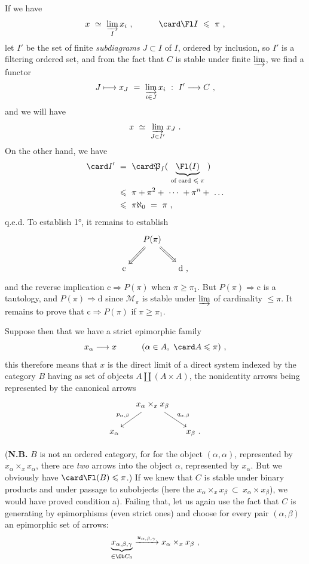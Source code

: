 
If we have
\[ x \ \simeq \ \varinjlim_{I} x_i \ , \qquad\quad \card \Fl I \ \leqslant \ \pi \ , \]
let $I'$ be the set of finite \textit{subdiagrams} $J \subset I$ of $I$, ordered by inclusion, so $I'$ is a filtering ordered set, and from the fact that $C$ is stable under finite $\varinjlim$, we find a functor
\[ J \longmapsto x_J \ = \ \varinjlim_{i\in J} x_i \ : \ I' \longrightarrow C \ , \]
and we will have
\[ x \ \simeq \ \varinjlim_{J\in I'} x_J \ . \]
On the other hand, we have
\[
\begin{aligned}
\card I' \ &= \ \card \mathfrak{P}_f( \ \underbrace{\Fl(I)}_{\text{of card $\leqslant \pi$}} \ ) \\
&\leqslant \ \pi + \pi^2 + \ \cdots \ + \pi^n + \ \dots \\
&\leqslant \ \pi\aleph_0 \ = \ \pi \ ,
\end{aligned}
\]
q.e.d. To establish 1°, it remains to establish
\[
\begin{tikzcd}[column sep=small]
& P(\pi) \arrow[dl, Rightarrow] \arrow[dr, Rightarrow] & \\
\mathrm{c} & & \mathrm{d} \text{ ,}
\end{tikzcd}
\]
and the reverse implication $\mathrm{c} \Longrightarrow P(\pi)$ when $\pi \geqslant \pi_1$. But $P(\pi) \Longrightarrow \mathrm{c}$ is a tautology, and $P(\pi) \Longrightarrow \mathrm{d}$ since $\mathcal{M}_{\pi}$ is stable under $\varinjlim$ of cardinality $\leqslant \pi$. It remains to prove that $\mathrm{c} \Longrightarrow P(\pi)$ if $\pi \geqslant \pi_1$.

Suppose then that we have a strict epimorphic family
\[ x_{\alpha} \longrightarrow x \qquad\quad (\alpha \in A,\ \card A \leqslant \pi) \ , \]
this therefore means that $x$ is the direct limit of a direct system indexed by the category $B$ having as set of objects $A \amalg (A\times A)$, the nonidentity arrows being represented by the canonical arrows
\[
\begin{tikzcd}[column sep=small]
& x_{\alpha} \times_x x_{\beta} \arrow[dl, "p_{\alpha,\beta}"'] \arrow[dr, "q_{\alpha,\beta}"] & \\
x_{\alpha} & & x_{\beta} \text{ .}
\end{tikzcd}
\]

(\textbf{N.B.} $B$ is not an ordered category, for for the object $(\alpha,\alpha)$, represented by $x_{\alpha}\times_x x_{\alpha}$, %
there are \textit{two} arrows into the object $\alpha$, represented by $x_{\alpha}$. But we obviously have $\card \Fl(B) \leqslant \pi$.) If we knew that $C$ is stable under binary products and under passage to subobjects (here the $x_{\alpha} \times_x x_{\beta} \ \subset \ x_{\alpha} \times x_{\beta}$), we would have proved condition a). Failing that, let us again use the fact that $C$ is generating by epimorphisms (even strict ones) and choose for every pair $(\alpha,\beta)$ an epimorphic set of arrows:
\[ \underbrace{x_{\alpha,\beta,\gamma}}_{\in \Ob C_0} \xrightarrow{u_{\alpha,\beta,\gamma}} x_{\alpha} \times_x x_{\beta} \ , \]

